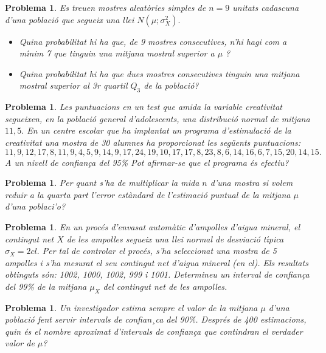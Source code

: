 \documentclass[11pt]{article}
\newcounter{prbcont}
\newtheorem{problema}[prbcont]{Problema}
\begin{document}
\begin{problema}
Es treuen mostres aleat\`ories simples de $n = 9$ unitats cadascuna d'una poblaci\'o que
segueix una llei $N(\mu; \sigma_X^2).$
\begin{itemize}
\item [(a)] Quina probabilitat hi ha que, de 9 mostres consecutives, n'hi hagi com a m\'{\i}nim
7 que tinguin una mitjana mostral superior a $\mu$ ? %
\item [(b)] Quina probabilitat hi ha que dues mostres consecutives tinguin una mitjana mostral
superior al 3r quartil $Q_3$ de la poblaci\'o? %
\end{itemize}
\end{problema}

\begin{problema}
Les puntuacions en un test que amida la variable creativitat segueixen, en la poblaci\'o general d'adolescents, una distribuci\'o normal de mitjana $11,5.$ En un centre escolar que ha implantat un programa d'estimulaci\'o de la creativitat una mostra de 30 alumnes ha proporcionat les seg\"uents puntuacions: 
\[11, 9, 12, 17, 8, 11, 9, 4, 5, 9, 14, 9, 17, 24, 19, 10, 17, 17, 8 , 23, 8, 6, 14, 16, 6, 7, 15, 20, 14, 15.\] 
A un nivell de confian\c{c}a del 95\% Pot afirmar-se que el programa \'es efectiu? 
\end{problema}



\begin{problema}
Per quant s'ha de multiplicar la mida $n$ d'una mostra si volem reduir a la quarta part
l'error est\`andard de l'estimaci\'o puntual de la mitjana $\mu$ d'una poblaci'o? %
\end{problema}

\begin{problema}
En un proc\'es d'envasat autom\`atic d'ampolles d'aigua mineral, el contingut net $X$ de les
ampolles segueix una llei normal de desviaci\'o t\'{\i}pica $\sigma_X = 2 cl.$ Per tal de controlar
el proc\'es, s'ha seleccionat una mostra de 5 ampolles i s'ha mesurat el seu contingut
net d'aigua mineral (en cl). Els resultats obtinguts s\'on: 1002, 1000, 1002, 999 i 1001.
Determineu un interval de confian\c{c}a del 99\% de la mitjana $\mu_X$ del contingut net de les
ampolles. %
\end{problema}

\begin{problema}
Un investigador estima sempre el valor de la mitjana $\mu$ d'una poblaci\'o fent servir intervals
de confian¸ca del 90\%. Despr\'es de 400 estimacions, quin \'es el nombre aproximat
d'intervals de confian\c{c}a que contindran el verdader valor de $\mu$? %
\end{problema}
\end{document}
